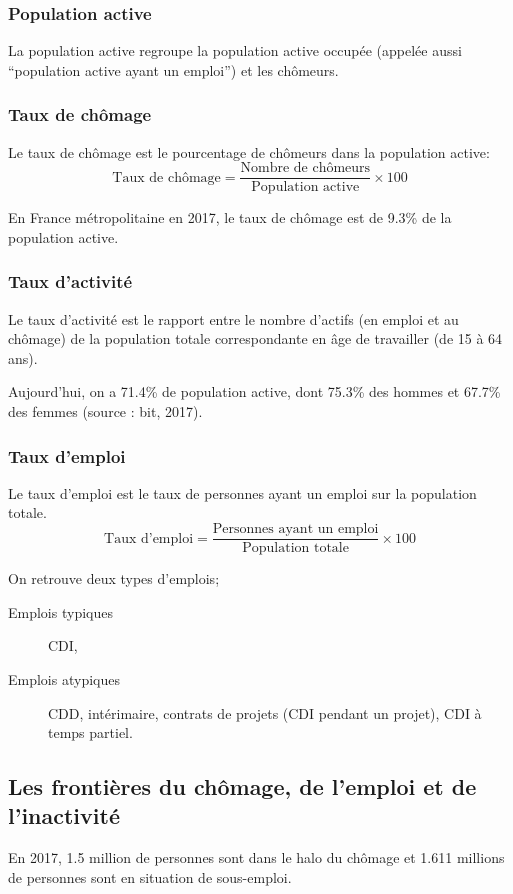\documentclass[10pt,a4paper,french]{article}
\begin{document}
\subsubsection{Population active}
La population active regroupe la population active occupée (appelée aussi ``population active ayant un emploi'') et les chômeurs.

\subsubsection{Taux de chômage}
Le taux de chômage est le pourcentage de chômeurs dans la population active:
\[ \text{Taux de chômage} = \frac{\text{Nombre de chômeurs}}{\text{Population active}} \times 100 \]

En France métropolitaine en 2017, le taux de chômage est de 9.3\% de la population active.

\subsubsection{Taux d'activité}
Le taux d'activité est le rapport entre le nombre d'actifs (en emploi et au chômage) de la population totale correspondante en âge de travailler (de 15 à 64 ans).

Aujourd'hui, on a 71.4\% de population active, dont 75.3\% des hommes et 67.7\% des femmes (source : \gls{bit}, 2017).

\subsubsection{Taux d'emploi}
Le taux d'emploi est le taux de personnes ayant un emploi sur la population totale.
\[ \text{Taux d'emploi} = \frac{\text{Personnes ayant un emploi}}{\text{Population totale}} \times 100 \]

On retrouve deux types d'emplois;
\begin{description}
\item[Emplois typiques] CDI,
\item[Emplois atypiques] CDD, intérimaire, contrats de projets (CDI pendant un projet), CDI à temps partiel.
\end{description}

\subsection{Les frontières du chômage, de l'emploi et de l'inactivité}
En 2017, 1.5 million de personnes sont dans le halo du chômage et 1.611 millions de personnes sont en situation de sous-emploi.
\end{document}
